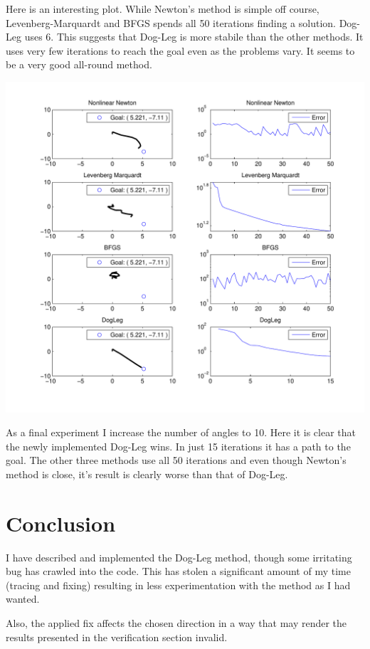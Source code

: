 \documentclass[10pt,oneside,a4paper,final,english]{memoir}
\begin{document}
Here is an interesting plot. While Newton's method is simple off
course, Levenberg-Marquardt and BFGS spends all 50 iterations finding
a solution. Dog-Leg uses 6. This suggests that Dog-Leg is more stabile
than the other methods. It uses very few iterations to reach the goal
even as the problems vary. It seems to be a very good all-round
method.

\begin{center}
\includegraphics[width=\textwidth]{images/graph5.pdf}
\end{center}
As a final experiment I increase the number of angles to 10. Here it
is clear that the newly implemented Dog-Leg wins. In just 15
iterations it has a path to the goal. The other three methods use all
50 iterations and even though Newton's method is close, it's result is
clearly worse than that of Dog-Leg.



\section{Conclusion}
I have described and implemented the Dog-Leg method, though some
irritating bug has crawled into the code. This has stolen a
significant amount of my time (tracing and fixing) resulting in less
experimentation with the method as I had wanted.

Also, the applied fix affects the chosen direction in a way that may
render the results presented in the verification section invalid.
\end{document}
